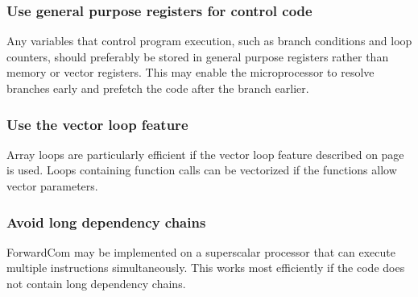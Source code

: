 \documentclass[forwardcom.tex]{subfiles}
\begin{document}
\subsubsection{Use general purpose registers for control code}
Any variables that control program execution, such as branch conditions and loop counters, should preferably be stored in general purpose registers rather than memory or vector registers. This may enable the microprocessor to resolve branches early and prefetch the code after the branch earlier.


\subsubsection{Use the vector loop feature}
Array loops are particularly efficient if the vector loop feature described on page \pageref{vectorLoops} is used. Loops containing function calls can be vectorized if the functions allow vector parameters.

\subsubsection{Avoid long dependency chains}
ForwardCom may be implemented on a superscalar processor that can execute multiple instructions simultaneously. This works most efficiently if the code does not contain long dependency chains.
\end{document}
